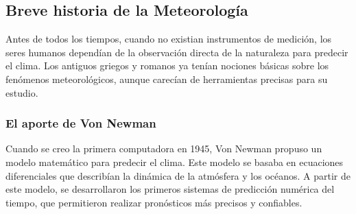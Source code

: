 \subsection*{Breve historia de la Meteorología}
Antes de todos los tiempos, cuando no existian instrumentos de medición, los seres humanos dependían de la observación directa de la naturaleza para predecir el clima. Los antiguos griegos y romanos ya tenían nociones básicas sobre los fenómenos meteorológicos, aunque carecían de herramientas precisas para su estudio.

\subsubsection*{El aporte de Von Newman}
Cuando se creo la primera computadora en 1945, Von Newman propuso un modelo matemático para predecir el clima. Este modelo se basaba en ecuaciones diferenciales que describían la dinámica de la atmósfera y los océanos. A partir de este modelo, se desarrollaron los primeros sistemas de predicción numérica del tiempo, que permitieron realizar pronósticos más precisos y confiables.